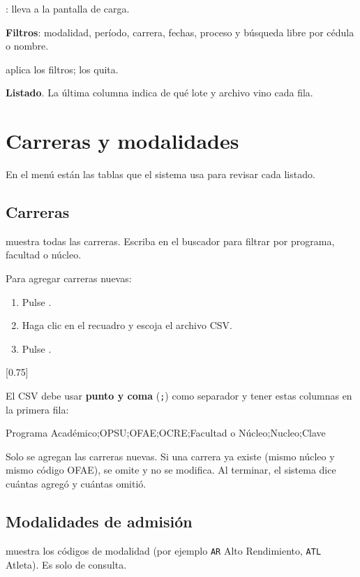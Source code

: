 \begin{leyenda}
  \item[1] : lleva a la pantalla de carga.
  \item[2] \textbf{Filtros}: modalidad, período, carrera, fechas, proceso y búsqueda libre por
        cédula o nombre.
  \item[3]  aplica los filtros;  los quita.
  \item[4] \textbf{Listado}. La última columna indica de qué lote y archivo vino cada fila.
\end{leyenda}

\section{Carreras y modalidades}

En el menú  están las tablas que el sistema usa para revisar cada listado.

\subsection{Carreras}

 muestra todas las carreras. Escriba en el buscador para filtrar por
programa, facultad o núcleo.

Para agregar carreras nuevas:
\begin{enumerate}
  \item Pulse .
  \item Haga clic en el recuadro y escoja el archivo CSV.
  \item Pulse .
\end{enumerate}

[0.75\linewidth]

El CSV debe usar \textbf{punto y coma} (\texttt{;}) como separador y tener estas columnas en la
primera fila:

\begin{center}
\ttfamily\small Programa Académico;OPSU;OFAE;OCRE;Facultad o Núcleo;Nucleo;Clave
\end{center}

\begin{nota}
Solo se agregan las carreras nuevas. Si una carrera ya existe (mismo núcleo y mismo código
OFAE), se omite y no se modifica. Al terminar, el sistema dice cuántas agregó y cuántas omitió.
\end{nota}

\subsection{Modalidades de admisión}

 muestra los códigos de modalidad (por ejemplo
\texttt{AR} Alto Rendimiento, \texttt{ATL} Atleta). Es solo de consulta.

